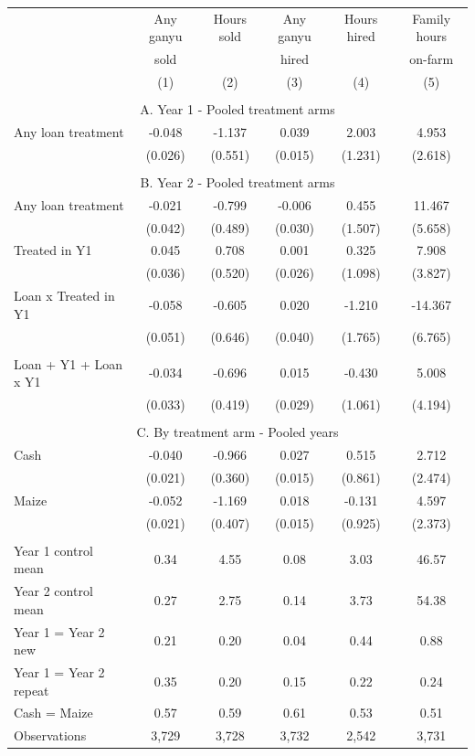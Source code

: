 \begin{tabular}{l cc cc c}
\hline
 & Any ganyu  & Hours sold & Any ganyu  & Hours hired & Family hours \\ 
 & sold & & hired & & on-farm \\ 
 & (1) & (2) & (3) & (4) & (5)  \\ 
\hline
 \\ 
\multicolumn{6}{c}{A. Year 1 - Pooled treatment arms} \\ 
Any loan treatment & -0.048 & -1.137 & 0.039 & 2.003 & 4.953 \\
 & (0.026) & (0.551) & (0.015) & (1.231) & (2.618) \\
 \\ 
\multicolumn{6}{c}{B. Year 2 - Pooled treatment arms} \\ 
Any loan treatment & -0.021 & -0.799 & -0.006 & 0.455 & 11.467 \\
 & (0.042) & (0.489) & (0.030) & (1.507) & (5.658) \\
Treated in Y1 & 0.045 & 0.708 & 0.001 & 0.325 & 7.908 \\
 & (0.036) & (0.520) & (0.026) & (1.098) & (3.827) \\
Loan x Treated in Y1 & -0.058 & -0.605 & 0.020 & -1.210 & -14.367 \\
 & (0.051) & (0.646) & (0.040) & (1.765) & (6.765) \\
 \\ 
Loan + Y1 + Loan x Y1 & -0.034 & -0.696 & 0.015 & -0.430 & 5.008 \\
 & (0.033) & (0.419) & (0.029) & (1.061) & (4.194) \\
 \\ 
\multicolumn{6}{c}{C. By treatment arm - Pooled years} \\ 
Cash & -0.040 & -0.966 & 0.027 & 0.515 & 2.712 \\
 & (0.021) & (0.360) & (0.015) & (0.861) & (2.474) \\
Maize & -0.052 & -1.169 & 0.018 & -0.131 & 4.597 \\
 & (0.021) & (0.407) & (0.015) & (0.925) & (2.373) \\
 \\ 
\hline
Year 1 control mean & 0.34 & 4.55 & 0.08 & 3.03 & 46.57 \\
Year 2 control mean & 0.27 & 2.75 & 0.14 & 3.73 & 54.38 \\
Year 1 = Year 2 new & 0.21 & 0.20 & 0.04 & 0.44 & 0.88 \\
Year 1 = Year 2 repeat & 0.35 & 0.20 & 0.15 & 0.22 & 0.24 \\
Cash = Maize & 0.57 & 0.59 & 0.61 & 0.53 & 0.51 \\
Observations &     3,729 &     3,728 &     3,732 &     2,542 &     3,731 \\
\hline
\end{tabular}
